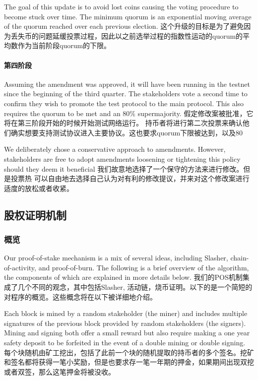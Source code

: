\documentclass[letterpaper]{article}
\begin{document}
The goal of this update is to avoid lost coins causing the voting procedure to
become stuck over time. The minimum quorum is an exponential moving average of
the quorum reached over each previous election.
这个升级的目标是为了避免因为丢失币的问题延缓投票过程，因此以之前选举过程的指数性运动的quorum的平均数作为当前阶段quorum的下限。

\paragraph{第四阶段} Assuming the amendment was approved, it will have
been running in the testnet since the beginning of the third quarter.
The stakeholders vote a second time to confirm they wish to promote the test
protocol to the main protocol. This also requires the quorum to be met and an
$80\%$ supermajority.
假定修改案被批准，它将在第三阶段开始的时候开始测试网络运行。
持币者将进行第二次投票来确认他们确实想要支持测试协议进入主要协议。这也要求quorum下限被达到，以及80%


We deliberately chose a conservative approach to amendments. However,
stakeholders are free to adopt amendments loosening or tightening this policy 
should they deem it beneficial
我们故意地选择了一个保守的方法来进行修改。但是投票热 可以自由地去选择自己认为对有利的修改提议，并来对这个修改案进行适度的放松或者收紧。

\subsection{股权证明机制}

\subsubsection{概览}

Our proof-of-stake mechanism is a mix of several ideas, including
Slasher\cite{Slasher}, chain-of-activity\cite{CoA}, and proof-of-burn.
The following is a brief overview of the algorithm, the components of which
are explained in more details below.
我们的POS机制集成了几个不同的观念，其中包括Slasher, 活动链，烧币证明。以下的是一个简短的对程序的概览。这些概念将在以下被详细地介绍。

Each block is mined by a random stakeholder (the miner) and includes
multiple signatures of the previous block provided by random 
stakeholders (the signers). Mining and signing both offer a small reward but
also require making a one year safety deposit to be
forfeited in the event of a double mining or double signing.
每个块随机由矿工挖出，包括了此前一个块的随机提取的持币者的多个签名。挖矿和签名都将获得一笔小奖励，但是也要求存一笔一年期的押金，如果期间出现双挖或者双签，那么这笔押金将被没收。
\end{document}
